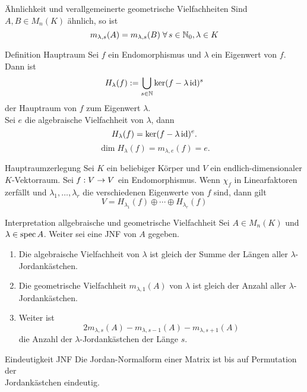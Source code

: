 \documentclass[main.tex]{subfiles}
\begin{document}
\begin{karte}{Ähnlichkeit und verallgemeinerte geometrische Vielfachheiten}
    Sind \(A, B \in M_n(K)\) ähnlich, so ist
    \[ m_{\lambda, s}(A) = m_{\lambda, s}(B) \; \forall s \in \N_0, \lambda \in K \]
\end{karte}

\begin{karte}{Definition Hauptraum}
    Sei \(f\) ein Endomorphismus und \(\lambda\) ein Eigenwert von \(f\). Dann ist
    \[ H_\lambda(f) := \bigcup_{s \in \mathbb{N}} \ker (f-\lambda \operatorname{id})^s \]
    der Hauptraum von \(f\) zum Eigenwert \(\lambda\).\\
    Sei \(e\) die algebraische Vielfachheit von \(\lambda\), dann
    \[ H_\lambda(f) = \ker(f-\lambda\operatorname{id})^e. \]
    \[ \dim H_\lambda(f) = m_{\lambda, e}(f) = e. \]
\end{karte}

\begin{karte}{Hauptraumzerlegung}
    Sei \(K\) ein beliebiger Körper und \(V\) ein endlich-dimensionaler \(K\)-Vektorraum.
    Sei \(f : V \rightarrow V\) ein Endomorphismus. Wenn \(\chi_f\) in Linearfaktoren
    zerfällt und \(\lambda_1, \ldots, \lambda_r\) die verschiedenen Eigenwerte
    von \(f\) sind, dann gilt
    \[ V = H_{\lambda_1}(f) \oplus \cdots \oplus H_{\lambda_r}(f) \]
\end{karte}

\begin{karte}{Interpretation allgebraische und geometrische Vielfachheit}
    Sei \(A \in M_n(K)\) und \(\lambda \in \operatorname{spec} A\). Weiter sei eine JNF von \(A\)
    gegeben.
    \begin{enumerate}
        \item Die algebraische Vielfachheit von \(\lambda\) ist gleich der Summe der
        Längen aller \(\lambda\)-Jordankästchen.
        \item Die geometrische Vielfachheit \(m_{\lambda,1}(A)\) von \(\lambda\) ist
        gleich der Anzahl aller \(\lambda\)-Jordankästchen.
        \item Weiter ist
        \[ 2m_{\lambda, s}(A)-m_{\lambda, s-1}(A) - m_{\lambda,s+1}(A) \]
        die Anzahl der \(\lambda\)-Jordankästchen der Länge \(s\).
    \end{enumerate}
\end{karte}

\begin{karte}{Eindeutigkeit JNF}
    Die Jordan-Normalform einer Matrix ist bis auf Permutation der \\
    Jordankästchen eindeutig.
\end{karte}
\end{document}
